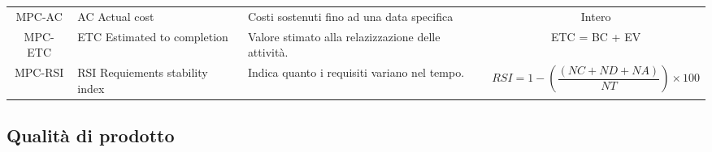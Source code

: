 \begin{table}[H]
\begin{tabular}{| c | p{4.2cm} | p{5cm} |c  }
        MPC-AC                                                         & AC Actual cost                  & Costi sostenuti fino ad una data specifica                                                & Intero                                                                                 \\
        MPC-ETC                                                        & ETC Estimated to completion     & Valore stimato alla relazizzazione delle attività.                                        & ETC = BC + EV                                                                          \\
        MPC-RSI                                                        & RSI Requiements stability index & Indica quanto i requisiti variano nel tempo.                                              & \begin{equation}RSI = 1- \left( \frac{(NC + ND + NA)}{NT} \right) \times 100\end{equation} \\
        \hline
    \end{tabular}
\end{table}
\subsection{Qualità di prodotto}
